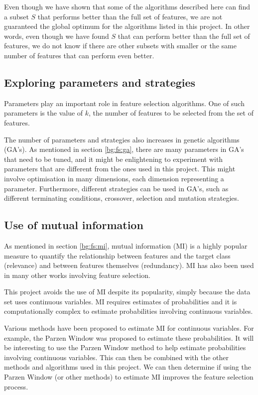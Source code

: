 \documentclass[12pt, twoside, a4paper]{report}
\begin{document}
Even though we have shown that some of the algorithms described here can find a subset $S$ that performs better than the full set of features, we are not guaranteed the global optimum for the algorithms listed in this project. In other words, even though we have found $S$ that can perform better than the full set of features, we do not know if there are other subsets with smaller or the same number of features that can perform even better.

 

\subsection{Exploring parameters and strategies}

Parameters play an important role in feature selection algorithms. One of such parameters is the value of $k$, the number of features to be selected from the set of features.

The number of parameters and strategies also increases in genetic algorithms (GA's). As mentioned in section \ref{bg:fs:ga}, there are many parameters in GA's that need to be tuned, and it might be enlightening to experiment with parameters that are different from the ones used in this project. This might involve optimisation in many dimensions, each dimension representing a parameter. Furthermore, different strategies can be used in GA's, such as different terminating conditions, crossover, selection and mutation strategies.


\subsection{Use of mutual information}
As mentioned in section \ref{bg:fs:mi}, mutual information (MI) is a highly popular measure to quantify the relationship between features and the target class (relevance) and between features themselves (redundancy). MI has also been used in many other works involving feature selection.

This project avoids the use of MI despite its popularity, simply because the data set uses continuous variables. MI requires estimates of probabilities and it is computationally complex to estimate probabilities involving continuous variables.

Various methods have been proposed to estimate MI for continuous variables. For example, the Parzen Window \cite{RefWorks:183} was proposed to estimate these probabilities. It will be interesting to use the Parzen Window method to help estimate probabilities involving continuous variables. This can then be combined with the other methods and algorithms used in this project. We can then determine if using the Parzen Window (or other methods) to estimate MI improves the feature selection process.


\newpage

\singlespacing
{}



\end{document}
